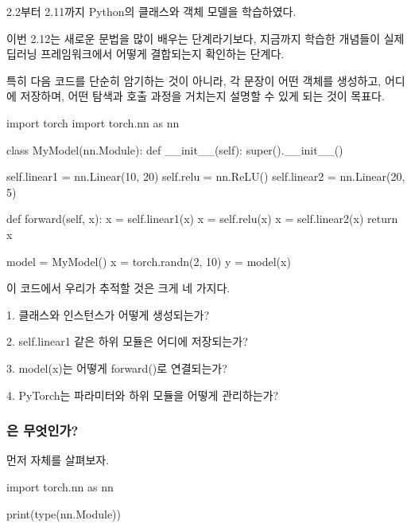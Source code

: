 

2.2부터 2.11까지 Python의 클래스와 객체 모델을 학습하였다.

이번 2.12는 새로운 문법을 많이 배우는 단계라기보다, 지금까지 학습한 개념들이 실제 딥러닝 프레임워크에서 어떻게 결합되는지 확인하는 단계다.

특히 다음 코드를 단순히 암기하는 것이 아니라, 각 문장이 어떤 객체를 생성하고, 어디에 저장하며, 어떤 탐색과 호출 과정을 거치는지 설명할 수 있게 되는 것이 목표다.

\begin{dhkcode}
import torch
import torch.nn as nn


class MyModel(nn.Module):
    def __init__(self):
        super().__init__()

        self.linear1 = nn.Linear(10, 20)
        self.relu = nn.ReLU()
        self.linear2 = nn.Linear(20, 5)

    def forward(self, x):
        x = self.linear1(x)
        x = self.relu(x)
        x = self.linear2(x)
        return x


model = MyModel()
x = torch.randn(2, 10)
y = model(x)
\end{dhkcode}

이 코드에서 우리가 추적할 것은 크게 네 가지다.

\begin{dhksmry}
1. 클래스와 인스턴스가 어떻게 생성되는가?

2. self.linear1 같은 하위 모듈은 어디에 저장되는가?

3. model(x)는 어떻게 forward()로 연결되는가?

4. PyTorch는 파라미터와 하위 모듈을 어떻게 관리하는가?
\end{dhksmry}

\subsubsection{은 무엇인가?}

먼저  자체를 살펴보자.

\begin{dhkcode}
import torch.nn as nn

print(type(nn.Module))
\end{dhkcode}


